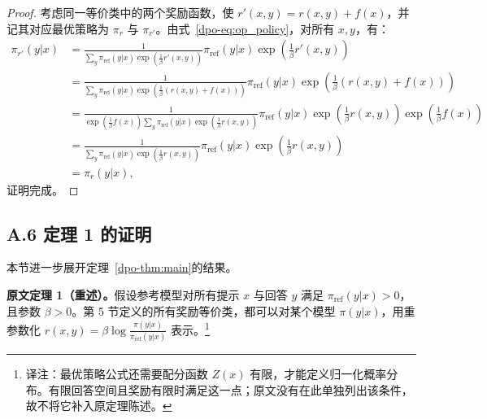 \begin{proof}
考虑同一等价类中的两个奖励函数，使 $r'(x,y)=r(x,y)+f(x)$，并记其对应最优策略为 $\pi_r$ 与 $\pi_{r'}$。由式~\ref{dpo-eq:op_policy}，对所有 $x,y$，有：
\label{dpo-display-28}
\begin{align*}
    \pi_{r'}(y|x) &= \frac{1}{\sum_{y}\pi_{\mathrm{ref}}(y|x)\exp\left(\frac{1}{\beta}r'(x, y)\right)}\pi_{\mathrm{ref}}(y|x)\exp\left(\frac{1}{\beta}r'(x, y)\right) \\
    &= \frac{1}{\sum_{y}\pi_{\mathrm{ref}}(y|x)\exp\left(\frac{1}{\beta}(r(x, y) + f(x))\right)}\pi_{\mathrm{ref}}(y|x)\exp\left(\frac{1}{\beta}(r(x, y)+f(x))\right) \\
    &= \frac{1}{\exp\left(\frac{1}{\beta}f(x)\right)\sum_{y}\pi_{\mathrm{ref}}(y|x)\exp\left(\frac{1}{\beta}r(x, y)\right)}\pi_{\mathrm{ref}}(y|x)\exp\left(\frac{1}{\beta}r(x, y)\right)\exp\left(\frac{1}{\beta}f(x)\right) \\
    &= \frac{1}{\sum_{y}\pi_{\mathrm{ref}}(y|x)\exp\left(\frac{1}{\beta}r(x, y)\right)}\pi_{\mathrm{ref}}(y|x)\exp\left(\frac{1}{\beta}r(x, y)\right) \\
    &= \pi_r(y|x),
\end{align*}
证明完成。\qedhere
\end{proof}




\subsection*{A.6 定理 1 的证明}

本节进一步展开定理~\ref{dpo-thm:main}的结果。


\textbf{原文定理 1（重述）。}假设参考模型对所有提示 $x$ 与回答 $y$ 满足 $\pi_{\mathrm{ref}}(y|x)>0$，且参数 $\beta>0$。第 5 节定义的所有奖励等价类，都可以对某个模型 $\pi(y|x)$，用重参数化 $r(x,y)=\beta\log\frac{\pi(y|x)}{\pi_{\mathrm{ref}}(y|x)}$ 表示。\footnote{译注：最优策略公式还需要配分函数 $Z(x)$ 有限，才能定义归一化概率分布。有限回答空间且奖励有限时满足这一点；原文没有在此单独列出该条件，故不将它补入原定理陈述。}

